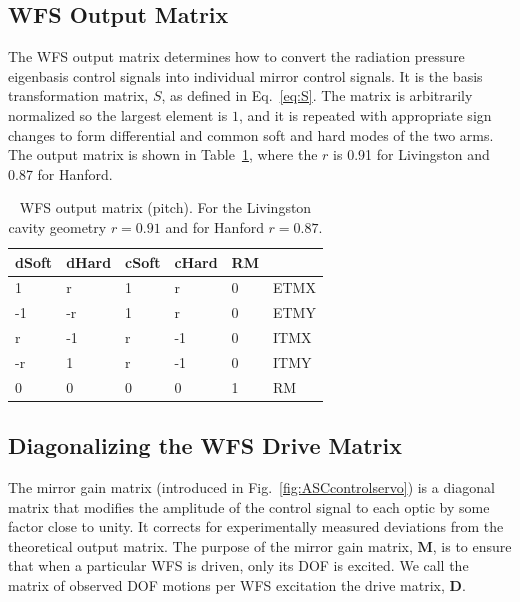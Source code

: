 


\subsection{WFS Output Matrix}
The WFS output matrix determines how to convert the radiation pressure
eigenbasis control signals into individual mirror control signals. It
is the basis transformation matrix, $S$, as defined in
Eq.~\ref{eq:S}. The matrix is arbitrarily normalized so the largest
element is $1$, and it is repeated with appropriate sign changes to
form differential and common soft and hard modes of the two arms. The
output matrix is shown in Table~\ref{table:output}, where the $r$ is
0.91 for Livingston and 0.87 for Hanford. 

\begin{table}
\centering
\caption[WFS output matrix]{WFS output matrix (pitch). For the Livingston cavity geometry
  $r=0.91$ and for Hanford $r=0.87$.}
\begin{tabular}{l l l l l l}
\hline 
dSoft & dHard & cSoft & cHard & RM & \\
\hline 
1 & r & 1 & r & 0 & ETMX\\
-1 & -r & 1 & r & 0 & ETMY \\
r & -1 & r & -1 & 0 & ITMX\\
-r & 1 & r & -1 & 0 & ITMY\\
 0 & 0 & 0 & 0 & 1 & RM\\
\hline
\end{tabular}
\label{table:output}
\end{table}



\subsection{Diagonalizing the WFS Drive Matrix}
\label{sec:mirrorgains}
The mirror gain matrix (introduced in Fig.~\ref{fig:ASCcontrolservo})
is a diagonal matrix that modifies the amplitude of the control signal
to each optic by some factor close to unity. It corrects for
experimentally measured deviations from the theoretical output
matrix. The purpose of the mirror gain matrix, $\mathbf{M}$, is to
ensure that when a particular WFS is driven, only its DOF is
excited. We call the matrix of observed DOF motions per WFS excitation
the drive matrix, $\mathbf{D}$.

